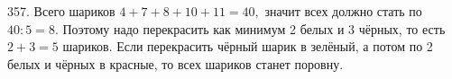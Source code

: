 357. Всего шариков $4+7+8+10+11=40,$ значит всех должно стать по $40:5=8.$ Поэтому надо перекрасить как минимум 2 белых и 3 чёрных, то есть $2+3=5$ шариков. Если перекрасить чёрный шарик в зелёный, а потом по 2 белых и чёрных в красные, то всех шариков станет поровну.\\

